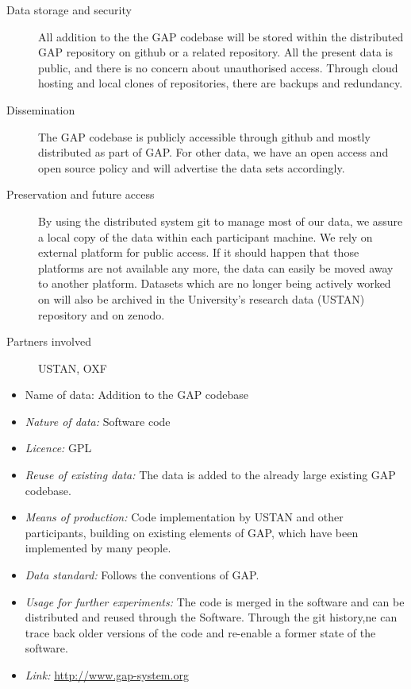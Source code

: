 \documentclass{../../Proposal/LaTeX-proposal/deliverablereport}
\begin{document}
\begin{description}
\item[Data storage and security] All addition to the the GAP codebase will be stored within the distributed GAP repository on github or a related repository. All the present data is public, and there is no concern about unauthorised access. Through cloud hosting and local clones of repositories, there are backups and redundancy.\label{GAPsec}
\item[Dissemination] The GAP codebase is publicly accessible through github and mostly distributed as part of GAP. For other data, we have an open access and open source policy and will advertise the data sets accordingly.
\label{GAPdiss}

\item[Preservation and future access] By using the distributed system git to manage most of our data, we assure a local copy of the data within each participant machine. We rely on external platform for public access. If it should happen that those platforms are not available any more, the data can easily be moved away to another platform. Datasets which are no longer being actively worked on will also be archived in the University's  research data (USTAN) repository and on zenodo.\label{Sagepres}
\item[Partners involved] USTAN, OXF
\end{description}


\begin{itemize}


\item{Name of data:} Addition to the GAP codebase
\item\textit{Nature of data:} Software code
\item\textit{Licence:} GPL
\item\textit{Reuse of existing data:} The data is added to the already large existing GAP codebase.
\item\textit{Means of production:} Code implementation by USTAN and other participants, building on existing elements of GAP, which have been implemented by many people.
\item\textit{Data standard:} Follows the conventions of GAP.
\item\textit{Usage for further experiments:} The code is merged in the software and can be distributed and reused through the Software. Through the git history,ne can trace back older versions of the code and re-enable a former state of the software.
\item\textit{Link:} \href{http://www.gap-system.org}{http://www.gap-system.org}
\end{itemize}
\end{document}
